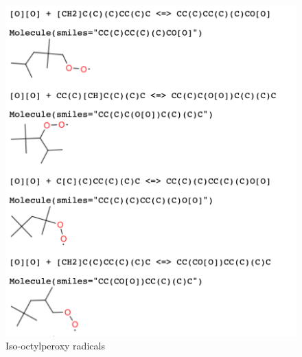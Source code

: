 \begin{figure}[!htp]
    \centering
    \includegraphics[scale=0.45, keepaspectratio]{images/iso-octyl-ROO.png}
    \caption{Iso-octylperoxy radicals }
    \label{fig:iso-octyl-peroxy radicals}
\end{figure}

